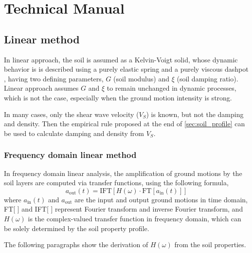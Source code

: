 \documentclass[11pt,letterpaper]{article}
\begin{document}
\newpage
\section{Technical Manual}\label{sec:manual}

\subsection{Linear method}\label{sec:linear}

In linear approach, the soil is assumed as a Kelvin-Voigt solid, whose dynamic behavior is is described using a purely elastic spring and a purely viscous dashpot \citep{Kramer1996}, having two defining parameters, $G$ (soil modulus) and $\xi$ (soil damping ratio). Linear approach assumes $G$ and $\xi$ to remain unchanged in dynamic processes, which is not the case, especially when the ground motion intensity is strong.

In many cases, only the shear wave velocity ($V_S$) is known, but not the damping and density. Then the empirical rule proposed at the end of \ref{sec:soil_profile} can be used to calculate damping and density from $V_S$.

\subsubsection{Frequency domain linear method}

In frequency domain linear analysis, the amplification of ground motions by the soil layers are computed via transfer functions, using the following formula,
\begin{equation}\label{eq:freq-domain-amplification}
    a_{\text{out}}\left(t\right)=\text{IFT}\left[H\left(\omega\right)\cdot\text{FT}\left[a_{\text{in}}(t)\right]\right]
\end{equation}
where $a_{\text{in}}(t)$ and $a_{\text{out}}$ are the input and output ground motions in time domain, FT[ ] and IFT[ ] represent Fourier transform and inverse Fourier transform, and $H(\omega)$ is the complex-valued transfer function in frequency domain, which can be solely determined by the soil property profile.

The following paragraphs show the derivation of $H(\omega)$ from the soil properties.
\end{document}
